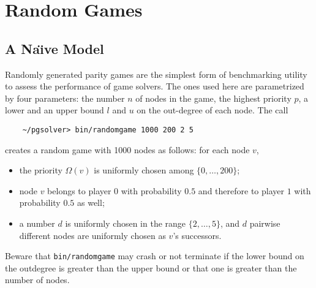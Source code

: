 
%

\section{Random Games}

\subsection{A Na\"{\i}ve Model}
Randomly generated parity games are the simplest form of benchmarking utility to assess the
performance of game solvers. The ones used here are parametrized by four parameters: the number
$n$ of nodes in the game, the highest priority $p$, a lower and an upper bound $l$ and $u$ on the
out-degree of each node. The call
\begin{verbatim}
    ~/pgsolver> bin/randomgame 1000 200 2 5
\end{verbatim}
creates a random game with 1000 nodes as follows: for each node $v$,
\begin{itemize}
\item the priority $\Omega(v)$ is uniformly chosen among $\{0,\ldots,200\}$;
\item node $v$ belongs to player $0$ with probability $0.5$ and therefore to player $1$ with
      probability $0.5$ as well;
\item a number $d$ is uniformly chosen in the range $\{2,\ldots,5\}$, and $d$ pairwise different
      nodes are uniformly chosen as $v$'s successors.
\end{itemize}
Beware that \texttt{bin/randomgame} may crash or not terminate if the lower bound on the outdegree
is greater than the upper bound or that one is greater than the number of nodes.


